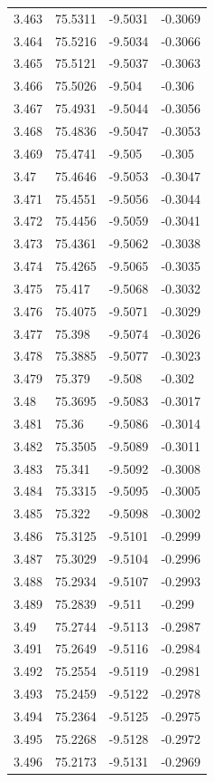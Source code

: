 \begin{tabular}{llll}
3.463 & 75.5311 & -9.5031 & -0.3069 \\
3.464 & 75.5216 & -9.5034 & -0.3066 \\
3.465 & 75.5121 & -9.5037 & -0.3063 \\
3.466 & 75.5026 & -9.504 & -0.306 \\
3.467 & 75.4931 & -9.5044 & -0.3056 \\
3.468 & 75.4836 & -9.5047 & -0.3053 \\
3.469 & 75.4741 & -9.505 & -0.305 \\
3.47 & 75.4646 & -9.5053 & -0.3047 \\
3.471 & 75.4551 & -9.5056 & -0.3044 \\
3.472 & 75.4456 & -9.5059 & -0.3041 \\
3.473 & 75.4361 & -9.5062 & -0.3038 \\
3.474 & 75.4265 & -9.5065 & -0.3035 \\
3.475 & 75.417 & -9.5068 & -0.3032 \\
3.476 & 75.4075 & -9.5071 & -0.3029 \\
3.477 & 75.398 & -9.5074 & -0.3026 \\
3.478 & 75.3885 & -9.5077 & -0.3023 \\
3.479 & 75.379 & -9.508 & -0.302 \\
3.48 & 75.3695 & -9.5083 & -0.3017 \\
3.481 & 75.36 & -9.5086 & -0.3014 \\
3.482 & 75.3505 & -9.5089 & -0.3011 \\
3.483 & 75.341 & -9.5092 & -0.3008 \\
3.484 & 75.3315 & -9.5095 & -0.3005 \\
3.485 & 75.322 & -9.5098 & -0.3002 \\
3.486 & 75.3125 & -9.5101 & -0.2999 \\
3.487 & 75.3029 & -9.5104 & -0.2996 \\
3.488 & 75.2934 & -9.5107 & -0.2993 \\
3.489 & 75.2839 & -9.511 & -0.299 \\
3.49 & 75.2744 & -9.5113 & -0.2987 \\
3.491 & 75.2649 & -9.5116 & -0.2984 \\
3.492 & 75.2554 & -9.5119 & -0.2981 \\
3.493 & 75.2459 & -9.5122 & -0.2978 \\
3.494 & 75.2364 & -9.5125 & -0.2975 \\
3.495 & 75.2268 & -9.5128 & -0.2972 \\
3.496 & 75.2173 & -9.5131 & -0.2969 \\

\end{tabular}
